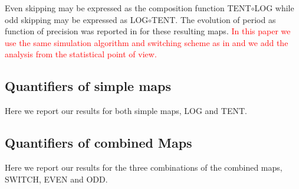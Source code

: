Even skipping may be expressed as the composition function TENT$\circ$LOG while odd skipping may be expressed as LOG$\circ$TENT.
The evolution of period as function of precision was reported in \cite{Nagaraj2008} for these resulting maps.
\textcolor{red}{In this paper we use the same simulation algorithm and switching scheme as in \cite{Nagaraj2008} and we add the analysis from the statistical point of view.}



\subsection {Quantifiers of simple maps}
\label{subsec:SimpleMaps}
Here we report our results for both simple maps, LOG and TENT.



 

\subsection{Quantifiers of combined Maps}\label{subsec:SecSwitch}
Here we report our results for the three combinations of the combined maps, SWITCH, EVEN and ODD.



